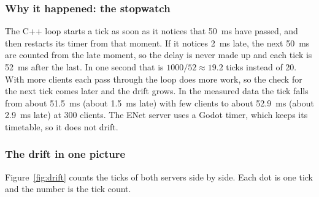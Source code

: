 \subsubsection{Why it happened: the stopwatch}
The C++ loop starts a tick as soon as it notices that 50~ms have passed, and then restarts its timer from that moment. If it notices 2~ms late, the next 50~ms are counted from the late moment, so the delay is never made up and each tick is 52~ms after the last. In one second that is $1000/52 \approx 19.2$ ticks instead of 20. With more clients each pass through the loop does more work, so the check for the next tick comes later and the drift grows. In the measured data the tick falls from about 51.5~ms (about 1.5~ms late) with few clients to about 52.9~ms (about 2.9~ms late) at 300 clients. The ENet server uses a Godot timer, which keeps its timetable, so it does not drift.

\subsubsection{The drift in one picture}
Figure~\ref{fig:drift} counts the ticks of both servers side by side. Each dot is one tick and the number is the tick count.

